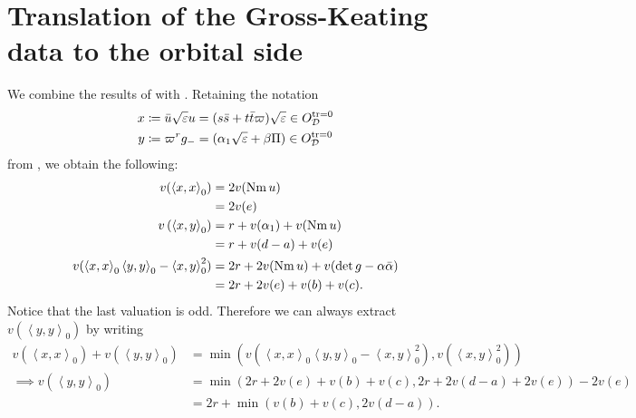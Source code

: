 \section{Translation of the Gross-Keating data to the orbital side}
We combine the results of  with .
Retaining the notation
\begin{align*}
  x &\coloneqq \bar u \sqrt{\varepsilon} u = (s \bar s + t \bar t \varpi) \sqrt{\varepsilon} \in O_\mathcal D^{\operatorname{tr} = 0} \\
  y &\coloneqq \varpi^r g_- = (\alpha_1\sqrt{\varepsilon} + \beta \Pi) \in O_\mathcal D^{\operatorname{tr} = 0}
\end{align*}
from , we obtain the following:
\begin{align*}
  v(\left\langle x,x \right\rangle _0)
    &= 2 v(\operatorname{Nm} u) \\
    &= 2v(e) \\
  v\left( \left\langle x,y \right\rangle _0 \right)
    &= r + v(\alpha_1) + v(\operatorname{Nm} u) \\
    &= r + v(d-a) + v(e) \\
  v(
    \left\langle x,x \right\rangle _0 \left\langle y,y \right\rangle _0
    - \left\langle x,y \right\rangle^2_0
  )
    &= 2r + 2 v(\operatorname{Nm} u) + v(\det g - \alpha \bar \alpha) \\
    &= 2r + 2v(e) + v(b) + v(c).
\end{align*}
Notice that the last valuation is odd.
Therefore we can always extract $v(\left\langle y,y \right\rangle _0)$ by writing
\begin{align*}
  v\left(\left\langle x,x \right\rangle _0\right) + v\left(\left\langle y,y \right\rangle _0\right)
  &= \min \left( v\left( \left\langle x,x \right\rangle _0 \left\langle y,y \right\rangle _0 - \left\langle x,y \right\rangle^2_0 \right),
    v(\left\langle x,y \right\rangle^2_0) \right) \\
  \implies  v\left(\left\langle y,y \right\rangle _0\right)
  &= \min(2r + 2v(e) + v(b) + v(c), 2r + 2v(d-a) + 2v(e)) - 2v(e) \\
  &= 2r + \min(v(b) + v(c), 2v(d-a)).
\end{align*}

